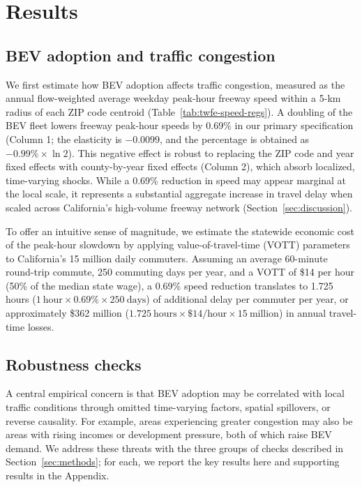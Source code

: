 \documentclass[11pt, letterpaper]{article}
\begin{document}
\section{Results}\label{sec:results}
\subsection{BEV adoption and traffic congestion}\label{sec:cost}
We first estimate how BEV adoption affects traffic congestion, measured as the annual flow-weighted average weekday peak-hour freeway speed within a 5-km radius of each ZIP code centroid (Table~\ref{tab:twfe-speed-regs}).
A doubling of the BEV fleet lowers freeway peak-hour speeds by 0.69\% in our primary specification (Column 1; the elasticity is $-0.0099$, and the percentage is obtained as $-0.99\% \times \ln 2$).
This negative effect is robust to replacing the ZIP code and year fixed effects with county-by-year fixed effects (Column 2), which absorb localized, time-varying shocks.
While a 0.69\% reduction in speed may appear marginal at the local scale, it represents a substantial aggregate increase in travel delay when scaled across California's high-volume freeway network (Section~\ref{sec:discussion}).

\begin{table} [H]
    \centering
    \caption{\small \textbf{Effects of BEV adoption on traffic congestion.}}
    \begin{footnotesize}
        
    \end{footnotesize}
    \label{tab:twfe-speed-regs}
\end{table}

To offer an intuitive sense of magnitude, we estimate the statewide economic cost of the peak-hour slowdown by applying value-of-travel-time (VOTT) parameters~\citep{Small2012} to California's 15 million daily commuters.
Assuming an average 60-minute round-trip commute, 250 commuting days per year, and a VOTT of \$14 per hour (50\% of the median state wage), a 0.69\% speed reduction translates to 1.725 hours ($1~\text{hour} \times 0.69\% \times 250~\text{days}$) of additional delay per commuter per year, or approximately \$362 million ($1.725~\text{hours} \times \$14/\text{hour} \times 15~\text{million}$) in annual travel-time losses.

\subsection{Robustness checks}
A central empirical concern is that BEV adoption may be correlated with local traffic conditions through omitted time-varying factors, spatial spillovers, or reverse causality.
For example, areas experiencing greater congestion may also be areas with rising incomes or development pressure, both of which raise BEV demand.
We address these threats with the three groups of checks described in Section~\ref{sec:methods}; for each, we report the key results here and supporting results in the Appendix.
\end{document}
